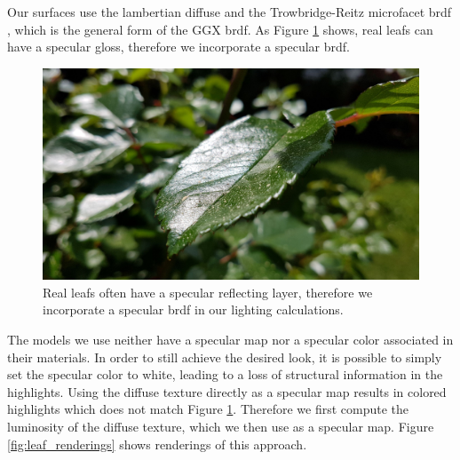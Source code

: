 Our surfaces use the lambertian diffuse \cite{lambert} and the Trowbridge-Reitz microfacet \ac{brdf} \cite{trowbridge_reitz}, which is the general form of the GGX \ac{brdf}.
As Figure \ref{fig:leaf_gloss} shows, real leafs can have a specular gloss, therefore we incorporate a specular \ac{brdf}.
\begin{figure}[ht]
    \centering
    \includegraphics[width=0.5\linewidth]{img/leaf_gloss.jpg}
    \caption[Leaf with glossy surface]{Real leafs often have a specular reflecting layer, therefore we incorporate a specular \ac{brdf} in our lighting calculations.}
    \label{fig:leaf_gloss}
\end{figure} 
The models we use neither have a specular map nor a specular color associated in their materials.
In order to still achieve the desired look, it is possible to simply set the specular color to white, leading to a loss of structural information in the highlights.
Using the diffuse texture directly as a specular map results in colored highlights which does not match Figure \ref{fig:leaf_gloss}.
Therefore we first compute the luminosity of the diffuse texture, which we then use as a specular map.
Figure \ref{fig:leaf_renderings} shows renderings of this approach.
